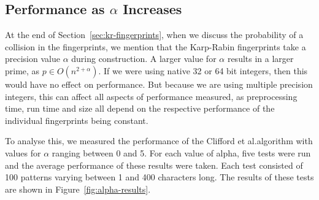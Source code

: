 \documentclass[ %
                    author={Dominic Joseph Moylett},
                    degree={MEng},
                     title={Dictionary Matching with Fingerprints},
                  subtitle={An Empirical Analysis},
                      type={research},
                      year={2015} ]{dissertation}
\begin{document}
\subsection{Performance as $\alpha$ Increases}

At the end of Section~\ref{sec:kr-fingerprints}, when we discuss the probability of a collision in the fingerprints, we mention that the Karp-Rabin fingerprints take a precision value $\alpha$ during construction. A larger value for $\alpha$ results in a larger prime, as $p \in O(n^{2 + \alpha})$. If we were using native 32 or 64 bit integers, then this would have no effect on performance. But because we are using multiple precision integers, this can affect all aspects of performance measured, as preprocessing time, run time and size all depend on the respective performance of the individual fingerprints being constant.

To analyse this, we measured the performance of the Clifford et al.\@ algorithm with values for $\alpha$ ranging between 0 and 5. For each value of alpha, five tests were run and the average performance of these results were taken. Each test consisted of 100 patterns varying between 1 and 400 characters long. The results of these tests are shown in Figure~\ref{fig:alpha-results}.
\end{document}
